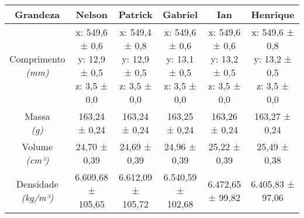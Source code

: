 \documentclass{article}
\begin{document}
\begin{table}[h!]
\centering
\begin{tabular}{c c c c c c }
\toprule
Grandeza & Nelson & Patrick & Gabriel & Ian & Henrique\\
\midrule
\shortstack{Comprimento\\\textit{(mm)}} & \shortstack{x: 549,6 ± 0,6\\y: 12,9 ± 0,5\\z: 3,5 ± 0,0} & \shortstack{x: 549,4 ± 0,8\\y: 12,9 ± 0,5\\z: 3,5 ± 0,0} & \shortstack{x: 549,6 ± 0,6\\y: 13,1 ± 0,5\\z: 3,5 ± 0,0} & \shortstack{x: 549,6 ± 0,6\\y: 13,2 ± 0,5\\z: 3,5 ± 0,0} & \shortstack{x: 549,6 ± 0,8\\y: 13,2 ± 0,5\\z: 3,5 ± 0,0}\\[4pt]
\shortstack{Massa\\\textit{(g)}} & 163,24 ± 0,24 & 163,24 ± 0,24 & 163,25 ± 0,24 & 163,26 ± 0,24 & 163,27 ± 0,24\\[4pt]
\shortstack{Volume\\\textit{(cm³)}} & 24,70 ± 0,39 & 24,69 ± 0,39 & 24,96 ± 0,39 & 25,22 ± 0,39 & 25,49 ± 0,38\\[4pt]
\shortstack{Densidade\\\textit{(kg/m³)}} & 6.609,68 ± 105,65 & 6.612,09 ± 105,72 & 6.540,59 ± 102,68 & 6.472,65 ± 99,82 & 6.405,83 ± 97,06\\[4pt]
\bottomrule
\end{tabular}
\end{table}
\end{document}

